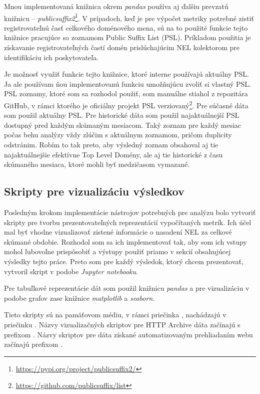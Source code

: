 Mnou implementovaná knižnica  okrem \textit{pandas} používa aj ďalšiu prevzatú knižnicu -- \textit{publicsuffix2}\footnote{\href{https://pypi.org/project/publicsuffix2/}{https://pypi.org/project/publicsuffix2/}}.
V prípadoch, keď je pre výpočet metriky potrebné zistiť registrovateľnú časť celkového doménového mena,
sú na to použité funkcie tejto knižnice pracujúce so zoznamom Public Suffix List (PSL). Príkladom použitia je získavanie registrovateľných častí domén prislúchajúcim NEL kolektorom pre identifikáciu ich poskytovateľa.

Je možnosť využiť funkcie tejto knižnice, ktoré interne používajú aktuálny PSL.
Ja ale používam ňou implementovanú funkciu umožňujúcu zvoliť si vlastný PSL.
PSL zoznamy, ktoré som sa rozhodol použiť, som manuálne stiahol z repozitára GitHub, v rámci ktorého je oficiálny projekt PSL verziovaný\footnote{\href{https://github.com/publicsuffix/list}{https://github.com/publicsuffix/list}}. 
Pre súčasné dáta som použil aktuálny PSL.
Pre historické dáta som použil najaktuálnejší PSL dostupný pred každým skúmaným mesiacom.
Taký zoznam pre každý mesiac počas behu analýzy vždy zlúčim s aktuálnym zoznamom, pričom duplicity odstránim.
Robím to tak preto, aby výsledný zoznam obsahoval aj tie najaktuálnejšie efektívne Top Level Domény, ale aj tie historické z času skúmaného mesiaca, ktoré mohli byť medzičasom vymazané.


\subsection{Skripty pre vizualizáciu výsledkov}
\label{visualize_results}

Posledným krokom implementácie nástrojov potrebných pre analýzu bolo vytvoriť skripty pre tvorbu prezentovateľných reprezentácií vypočítaných metrík.
Ich účel mal byť vhodne vizualizovať zistené informácie o nasadení NEL za celkové skúmané obdobie.
Rozhodol som sa ich implementovať tak, aby som ich vstupy mohol ľubovoľne prispôsobiť a výstupy použiť priamo v sekcií obsahujúcej výsledky tejto práce.
Preto som pre každý výsledok, ktorý chcem prezentovať, vytvoril skript v podobe \textit{Jupyter notebooku}.

Pre tabuľkové reprezentácie dát som použil knižnicu \textit{pandas} a pre vizualizáciu v podobe grafov zase knižnice \textit{matplotlib} a \textit{seaborn}.

Tieto skripty sú na pamäťovom médiu, v rámci priečinka , nachádzajú v priečinku .
Názvy vizualizačných skriptov pre HTTP Archive dáta začínajú s prefixom .
Názvy skriptov pre dáta získané automatizovaným prehliadaním webu začínajú prefixom .

